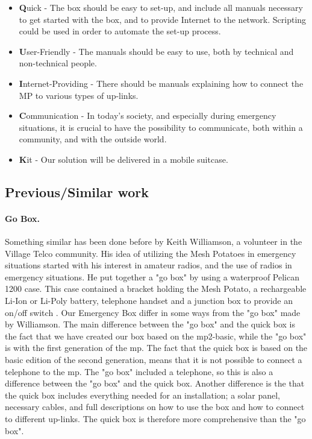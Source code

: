 \begin{itemize}
\item [] \textbf{Q}uick - The box should be easy to set-up, and include all manuals necessary to get started with the box, and to provide Internet to the network. Scripting could be used in order to automate the set-up process. 
\item [] \textbf{U}ser-Friendly - The manuals should be easy to use, both by technical and non-technical people. 
\item [] \textbf{I}nternet-Providing - There should be manuals explaining how to connect the MP to various types of up-links. 
\item [] \textbf{C}ommunication - In today's society, and especially during emergency situations, it is crucial to have the possibility to communicate, both within a community, and with the outside world.
\item [] \textbf{K}it - Our solution will be delivered in a mobile suitcase. 
\end{itemize}

 
\subsection{Previous/Similar work}
\paragraph{Go Box.} Something similar has been done before by Keith Williamson, a volunteer in the Village Telco community. His idea of utilizing the Mesh Potatoes in emergency situations started with his interest in amateur radios, and the use of radios in emergency situations. He put together a "go box" by using a waterproof Pelican 1200 case. This case contained a bracket holding the Mesh Potato, a rechargeable Li-Ion or Li-Poly battery, telephone handset and a junction box to provide an on/off switch \cite{keith}. Our Emergency Box differ in some ways from the "go box" made by Williamson. The main difference between the "go box" and the \gls{quick} box is the fact that we have created our box based on the \gls{mp2}-basic, while the "go box" is with the first generation of the \gls{mp}. The fact that the \gls{quick} box is based on the basic edition of the second generation, means that it is not possible to connect a telephone to the \gls{mp}. The "go box" included a telephone, so this is also a difference between the "go box" and the \gls{quick} box. Another difference is the that the \gls{quick} box includes everything needed for an installation;  a solar panel, necessary cables, and full descriptions on how to use the box and how to connect to different up-links. The \gls{quick} box is therefore more comprehensive than the "go box".

